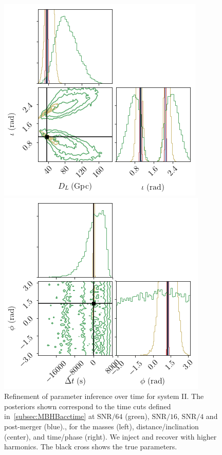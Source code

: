 \documentclass[aps,showpacs,twocolumn,prd,superscriptaddress,nofootinbib]{revtex4-1}
\begin{document}
\begin{figure}
\begin{minipage}{.32\linewidth}
      \includegraphics[width=.99\linewidth]{../plots/corner_smbh_case9_hm_tseries_Dinc.png}
   \end{minipage}
   \begin{minipage}{.32\linewidth}
      \includegraphics[width=.99\linewidth]{../plots/corner_smbh_case9_hm_tseries_tphi.png}
   \end{minipage}
  \caption{Refinement of parameter inference over time for system II. The posteriors shown correspond to the time cuts defined in~\ref{subsec:MBHBacctime} at $\mathrm{SNR}/64$ (green), $\mathrm{SNR}/16$, $\mathrm{SNR}/4$ and post-merger (blue)., for the masses (left), distance/inclination (center), and time/phase (right). We inject and recover with higher harmonics. The black cross shows the true parameters.}
  \label{fig:smbhCornerZoomHMCase9}
\end{figure}
\end{document}
